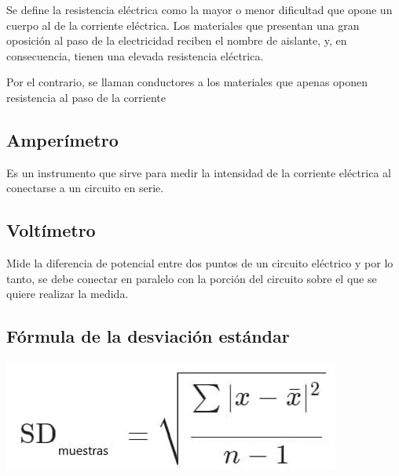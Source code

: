 \documentclass[letterpaper, 12pt]{report}
\begin{document}
Se define la resistencia eléctrica como la mayor o menor dificultad que
opone un cuerpo al de la corriente eléctrica. Los materiales que presentan
una gran oposición al paso de la electricidad reciben el nombre de
aislante, y, en consecuencia, tienen una elevada resistencia eléctrica.

\smallskip{}

Por el contrario, se llaman conductores a los materiales que apenas
oponen resistencia al paso de la corriente

\subsection{Amperímetro}

Es un instrumento que sirve para medir la intensidad de la corriente 
eléctrica al conectarse a un circuito en serie.

\subsection{Voltímetro}

Mide la diferencia de potencial entre dos puntos de un circuito eléctrico 
y por lo tanto, se debe conectar en paralelo con la porción del circuito 
sobre el que se quiere realizar la medida. 



\subsection{Fórmula de la desviación estándar}

\includegraphics[scale = .6]{./Images/FormulaDesviacionEstandar.png} \hfill
\break{}~\cite{ImagenDesviacionEstandar}
\label{img:desviacionEstandar}


\end{document}

